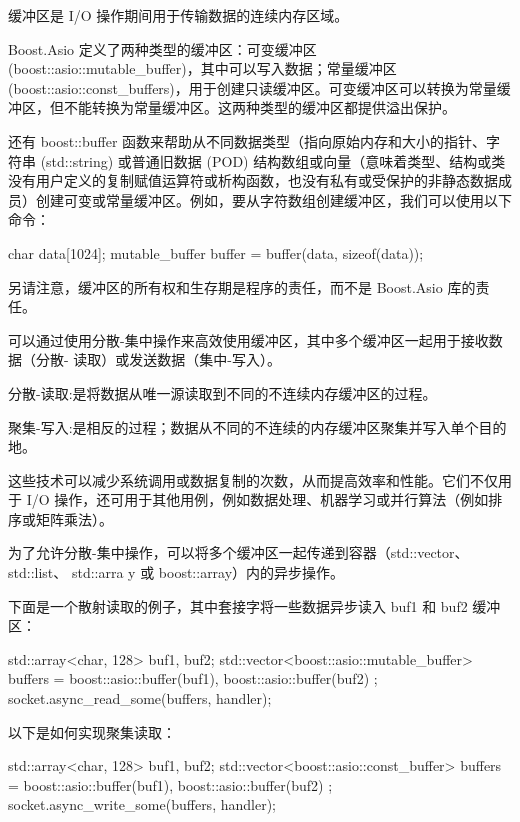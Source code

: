 
缓冲区是 I/O 操作期间用于传输数据的连续内存区域。

Boost.Asio 定义了两种类型的缓冲区：可变缓冲区 (boost::asio::mutable\_buffer)，其中可以写入数据；常量缓冲区 (boost::asio::const\_buffers)，用于创建只读缓冲区。可变缓冲区可以转换为常量缓冲区，但不能转换为常量缓冲区。这两种类型的缓冲区都提供溢出保护。

还有 boost::buffer 函数来帮助从不同数据类型（指向原始内存和大小的指针、字符串 (std::string) 或普通旧数据 (POD) 结构数组或向量（意味着类型、结构或类没有用户定义的复制赋值运算符或析构函数，也没有私有或受保护的非静态数据成员）创建可变或常量缓冲区。例如，要从字符数组创建缓冲区，我们可以使用以下命令：

\begin{cpp}
char data[1024];
mutable_buffer buffer = buffer(data, sizeof(data));
\end{cpp}

另请注意，缓冲区的所有权和生存期是程序的责任，而不是 Boost.Asio 库的责任。


可以通过使用分散-集中操作来高效使用缓冲区，其中多个缓冲区一起用于接收数据（分散- 读取）或发送数据（集中-写入）。

分散-读取:是将数据从唯一源读取到不同的不连续内存缓冲区的过程。

聚集-写入:是相反的过程；数据从不同的不连续的内存缓冲区聚集并写入单个目的地。

这些技术可以减少系统调用或数据复制的次数，从而提高效率和性能。它们不仅用于 I/O 操作，还可用于其他用例，例如数据处理、机器学习或并行算法（例如排序或矩阵乘法）。

为了允许分散-集中操作，可以将多个缓冲区一起传递到容器（std::vector、 std::list、 std::arra y 或 boost::array）内的异步操作。

下面是一个散射读取的例子，其中套接字将一些数据异步读入 buf1 和 buf2 缓冲区：

\begin{cpp}
std::array<char, 128> buf1, buf2;
std::vector<boost::asio::mutable_buffer> buffers = {
    boost::asio::buffer(buf1),
    boost::asio::buffer(buf2)
};
socket.async_read_some(buffers, handler);
\end{cpp}

以下是如何实现聚集读取：

\begin{cpp}
std::array<char, 128> buf1, buf2;
std::vector<boost::asio::const_buffer> buffers = {
    boost::asio::buffer(buf1),
    boost::asio::buffer(buf2)
};
socket.async_write_some(buffers, handler);
\end{cpp}

